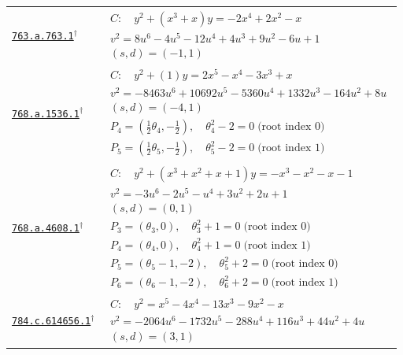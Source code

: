 \documentclass[10pt]{article}
\newcommand{\entryseparator}{\noalign{\vskip3pt\hbox to\linewidth{\leaders\hbox{\kern2pt\rule{3pt}{0.3pt}\kern2pt}\hfill}\nobreak\vskip3pt\nobreak}}
\begin{document}
\begin{landscape}
\begin{longtable}{@{}p{3.4cm}p{\dimexpr\linewidth-3.4cm-2\tabcolsep\relax}@{}}
\entryseparator
\href{https://www.lmfdb.org/Genus2Curve/Q/763/a/763/1}{\texttt{763.a.763.1}}$^{\dagger}$ & $\begin{gathered}C:\quad y^2+\left(x^{3} + x\right)y=-2 x^{4} + 2 x^{2} - x\\v^2=8 u^{6} - 4 u^{5} - 12 u^{4} + 4 u^{3} + 9 u^{2} - 6 u + 1\\(s,d)=(-1,1)\end{gathered}$ \\
\entryseparator
\href{https://www.lmfdb.org/Genus2Curve/Q/768/a/1536/1}{\texttt{768.a.1536.1}}$^{\dagger}$ & $\begin{gathered}C:\quad y^2+\left(1\right)y=2 x^{5} - x^{4} - 3 x^{3} + x\\v^2=-8463 u^{6} + 10692 u^{5} - 5360 u^{4} + 1332 u^{3} - 164 u^{2} + 8 u\\(s,d)=(-4,1)\\P_{4}=\left(\frac{1}{2} \theta_{4},-\frac{1}{2}\right),\quad \theta_{4}^{2} - 2=0\;\text{(root index 0)}\\P_{5}=\left(\frac{1}{2} \theta_{5},-\frac{1}{2}\right),\quad \theta_{5}^{2} - 2=0\;\text{(root index 1)}\end{gathered}$ \\
\entryseparator
\href{https://www.lmfdb.org/Genus2Curve/Q/768/a/4608/1}{\texttt{768.a.4608.1}}$^{\dagger}$ & $\begin{gathered}C:\quad y^2+\left(x^{3} + x^{2} + x + 1\right)y=-x^{3} - x^{2} - x - 1\\v^2=-3 u^{6} - 2 u^{5} - u^{4} + 3 u^{2} + 2 u + 1\\(s,d)=(0,1)\\P_{3}=\left(\theta_{3},0\right),\quad \theta_{3}^{2} + 1=0\;\text{(root index 0)}\\P_{4}=\left(\theta_{4},0\right),\quad \theta_{4}^{2} + 1=0\;\text{(root index 1)}\\P_{5}=\left(\theta_{5} - 1,-2\right),\quad \theta_{5}^{2} + 2=0\;\text{(root index 0)}\\P_{6}=\left(\theta_{6} - 1,-2\right),\quad \theta_{6}^{2} + 2=0\;\text{(root index 1)}\end{gathered}$ \\
\entryseparator
\href{https://www.lmfdb.org/Genus2Curve/Q/784/c/614656/1}{\texttt{784.c.614656.1}}$^{\dagger}$ & $\begin{gathered}C:\quad y^2=x^{5} - 4 x^{4} - 13 x^{3} - 9 x^{2} - x\\v^2=-2064 u^{6} - 1732 u^{5} - 288 u^{4} + 116 u^{3} + 44 u^{2} + 4 u\\(s,d)=(3,1)\end{gathered}$ \\

\end{longtable}
\end{landscape}
\end{document}
